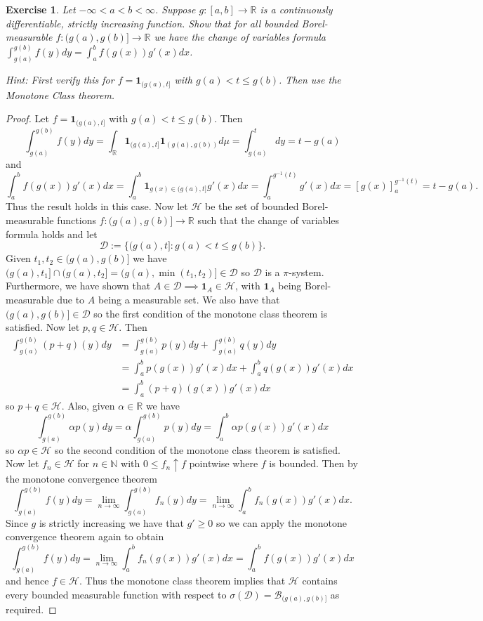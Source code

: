 \documentclass{article}
\newtheorem{exercise}[theorem]{Exercise}
\begin{document}
\begin{exercise}
Let $-\infty < a < b < \infty$. Suppose $g : [a, b] \to \mathbb{R}$ is a continuously differentiable, strictly increasing function. Show that for all bounded Borel-measurable $f : (g(a), g(b)] \to \mathbb{R}$ we have the change of variables formula $\int_{g(a)}^{g(b)} f(y)dy = \int_{a}^{b} f(g(x))g'(x)dx$. 

\textit{Hint: First verify this for $f = \mathbf{1}_{(g(a),t]}$ with $g(a) < t \leq g(b)$. Then use the Monotone Class theorem.}
\end{exercise}
\begin{proof}
Let $f=\mathbf{1}_{(g(a),t]}$ with $g(a)<t\leq g(b)$. Then\[\int_{g(a)}^{g(b)}f(y)dy=\int_\mathbb{R}\mathbf{1}_{(g(a),t]}\mathbf{1}_{(g(a),g(b))}d\mu=\int_{g(a)}^{t}dy=t-g(a)\] and\[\int_a^bf(g(x))g'(x)dx=\int_a^b\mathbf{1}_{g(x)\in(g(a),t]}g'(x)dx=\int_a^{g^{-1}(t)}g'(x)dx=[g(x)]_a^{g^{-1}(t)}=t-g(a).\] Thus the result holds in this case. Now let $\mathcal{H}$ be the set of bounded Borel-measurable functions $f:(g(a),g(b)]\to\mathbb{R}$ such that the change of variables formula holds and let \[\mathcal{D}:=\{(g(a),t]:g(a)<t\leq g(b)\}.\] Given $t_1,t_2\in(g(a),g(b)]$ we have $(g(a),t_1]\cap(g(a),t_2]=(g(a),\min(t_1,t_2)]\in\mathcal{D}$ so $\mathcal{D}$ is a $\pi$-system. Furthermore, we have shown that $A\in\mathcal{D}\implies\mathbf{1}_A\in\mathcal{H}$, with $\mathbf{1}_A$ being Borel-measurable due to $A$ being a measurable set. We also have that $(g(a),g(b)]\in\mathcal{D}$ so the first condition of the monotone class theorem is satisfied. Now let $p,q\in\mathcal{H}$. Then\begin{align*}\int_{g(a)}^{g(b)}(p+q)(y)dy&=\int_{g(a)}^{g(b)}p(y)dy+\int_{g(a)}^{g(b)}q(y)dy\\&=\int_a^bp(g(x))g'(x)dx+\int_a^bq(g(x))g'(x)dx\\&=\int_a^b(p+q)(g(x))g'(x)dx\end{align*} so $p+q\in\mathcal{H}$. Also, given $\alpha\in\mathbb{R}$ we have\[\int_{g(a)}^{g(b)}\alpha p(y)dy=\alpha\int_{g(a)}^{g(b)}p(y)dy=\int_a^b\alpha p(g(x))g'(x)dx\] so $\alpha p\in\mathcal{H}$ so the second condition of the monotone class theorem is satisfied. Now let $f_n\in\mathcal{H}$ for $n\in\mathbb{N}$ with $0\leq f_n\uparrow f$ pointwise where $f$ is bounded. Then by the monotone convergence theorem \[\int_{g(a)}^{g(b)}f(y)dy=\lim_{n\to\infty}\int_{g(a)}^{g(b)}f_n(y)dy=\lim_{n\to\infty}\int_a^bf_n(g(x))g'(x)dx.\] Since $g$ is strictly increasing we have that $g'\geq0$ so we can apply the monotone convergence theorem again to obtain\[\int_{g(a)}^{g(b)}f(y)dy=\lim_{n\to\infty}\int_a^bf_n(g(x))g'(x)dx=\int_a^bf(g(x))g'(x)dx\] and hence $f\in\mathcal{H}$. Thus the monotone class theorem implies that $\mathcal{H}$ contains every bounded measurable function with respect to $\sigma(\mathcal{D})=\mathcal{B}_{(g(a),g(b)]}$ as required.
\end{proof}
\end{document}
